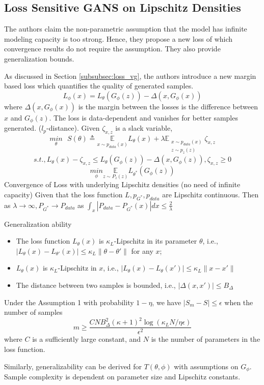 \subsection*{Loss Sensitive GANS on Lipschitz Densities \citep{ls-gan}}
The authors claim the non-parametric assumption that the model has infinite modeling capacity is too strong. Hence, they propose a new loss of which convergence results do not require the assumption. They also provide generalization bounds.

As discussed in Section \ref{subsubsec:loss_vg}, the authors introduce a new margin based loss which quantifies the quality of generated samples.
$$L_{\phi}(x) = L_{\theta}(G_{\phi}(z)) - \Delta(x, G_{\phi}(x)) $$ where $\Delta(x, G_{\phi}(x))$ is the margin between the losses is the difference between $x$ and $G_{\phi}(z)$. \newline The loss is data-dependent and vanishes for better samples generated. ($l_{p}$-distance). Given $\zeta_{x,z}$ is a slack variable, 
$$\underset{\theta }{min}\mbox{ }S(\theta) \triangleq \underset{x\sim p_{data}(x)}{\mathbb{E}} L_{\theta}(x) + \lambda \mathbb{E}_{\substack{{x\sim p_{data}(x)}\\{z\sim p_{z}(z)}}} \zeta_{x,z}$$
$$s.t., L_{\theta}(x) -  \zeta_{x,z} \leq L_{\theta}(G_{\phi}(z)) - \Delta(x, G_{\phi}(z)), \zeta_{x,z} \geq 0$$
$$\underset{\phi}{min} \underset{z\sim P_{z}(z)}{\mathbb{E}}L_{\theta^*}(G_{\phi}(z))$$
Convergence of Loss with underlying Lipschitz densities (no need of infinite capacity)
Given that the loss function $L, p_{G^*}, p_{data}$ are Lipschitz continuous. Then as $\lambda \rightarrow \infty, P_{G^*} \rightarrow P_{data}$ as $\int_{x} |P_{data} - P_{G^*}(x)|dx \leq \frac{2}{\lambda}$ 

\noindent Generalization ability
\begin{assumption}
\begin{itemize}
\item The loss function $L_{\theta}(x)$ is $\kappa_{L}$-Lipschitz in its parameter $\theta$, i.e., $|L_{\theta}(x) - L_{\theta'}(x)| \leq \kappa_{L} \parallel \theta - \theta' \parallel$ for any $x$;
\item $L_{\theta}(x)$ is $\kappa_{L}$-Lipschitz in $x$, i.e., $|L_{\theta}(x) - L_{\theta}(x')| \leq \kappa_{L} \parallel x - x' \parallel$
\item The distance between two samples is bounded, i.e., $|\Delta(x, x')| \leq B_{\Delta}$
\end{itemize}
\end{assumption}
\begin{theorem}
Under the Assumption 1 with probability $1 - \eta$, we have $|S_{m} - S| \leq \epsilon$ when the number of samples $$m \geq \frac{CNB^2_{\Delta}(\kappa + 1)^2 \log(\kappa_{L}N/\eta \epsilon) }{\epsilon^2}$$ where $C$ is a sufficiently large constant, and $N$ is the number of parameters in the loss function. 
\end{theorem}
Similarly, generalizability can be derived for $T(\theta, \phi)$ with assumptions on $G_{\phi}$. Sample complexity is dependent on parameter size and Lipschitz constants.

